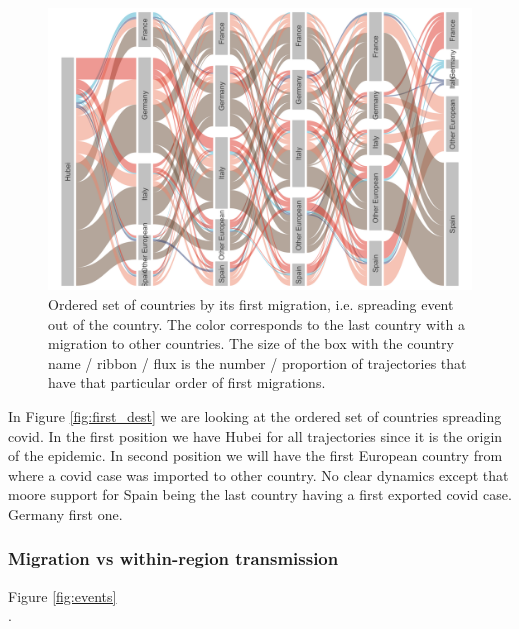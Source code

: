 \documentclass[12pt,]{article}
\begin{document}
\begin{figure}[ht]
    \centering
    \includegraphics[width=\textwidth]{201014_europe2_figtraj05.png}
    \caption{Ordered set of countries by its first migration, i.e. spreading event out of the country. The color corresponds to the last country with a migration to other countries. The size of the box with the country name / ribbon / flux is the number / proportion of trajectories that have that particular order of first migrations.}
    \label{fig:first_src}
\end{figure}


In Figure \ref{fig:first_dest} we are looking at the ordered set of countries spreading covid. In the first position we have Hubei for all trajectories since it is the origin of the epidemic. In second position we will have the first European country from where a covid case was imported to other country. No clear dynamics except that moore support for Spain being the last country having a first exported covid case. Germany first one.\\  

\subsubsection*{Migration vs within-region transmission}

Figure \ref{fig:events}\\.
\end{document}

